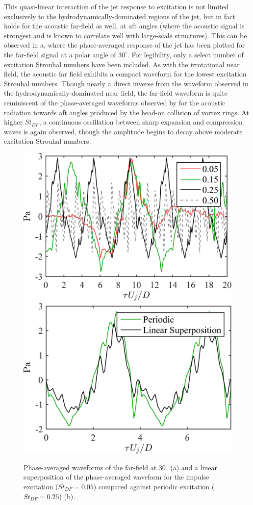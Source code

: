 This quasi-linear interaction of the jet response to excitation is not limited exclusively to the hydrodynamically-dominated regions of the jet, but in fact holds for the acoustic far-field as well, at aft angles (where the acoustic signal is strongest and is known to correlate well with large-scale structures). 
This can be observed in a, where the phase-averaged response of the jet has been plotted for the far-field signal at a polar angle of $30^\circ$. 
For legibility, only a select number of excitation Strouhal numbers have been included. 
As with the irrotational near field, the acoustic far field exhibits a compact waveform for the lowest excitation Strouhal numbers. 
Though nearly a direct inverse from the waveform observed in the hydrodynamically-dominated near field, the far-field waveform is quite reminiscent of the phase-averaged waveforms observed by \citet{Kambe1983} for the acoustic radiation towards aft angles produced by the head-on collision of vortex rings. 
At higher $St_{DF}$, a continuous oscillation between sharp expansion and compression waves is again observed, though the amplitude begins to decay above moderate excitation Strouhal numbers. 
\begin{figure}
	\centering
	\includegraphics[width=0.45\linewidth]{Figures/ch3_farfield_phavg_v2.png}
	\includegraphics[width=0.45\linewidth]{Figures/ch3_farfield_linear_v2.png}
	\caption{Phase-averaged waveforms of the far-field at $30^\circ$ (a) and a linear superposition of the phase-averaged waveform for the impulse excitation ($St_{DF} = 0.05$) compared against periodic excitation ($St_{DF} = 0.25$) (b).}
	\label{fig:ch3_farfield}
\end{figure}

